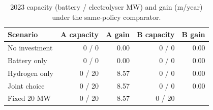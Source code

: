 \begin{table}[H]
\centering\small
\caption{2023 capacity (battery / electrolyser MW) and gain (\gbp m/year) under the same-policy comparator.}
\label{tab:portfolios}
\begin{tabularx}{\linewidth}{@{}Y r r r r@{}}
\toprule
Scenario & A capacity & A gain & B capacity & B gain \\
\midrule
No investment & 0 / 0 & 0.00 & 0 / 0 & 0.00 \\
Battery only & 0 / 0 & 0.00 & 0 / 0 & 0.00 \\
Hydrogen only & 0 / 20 & 8.57 & 0 / 0 & 0.00 \\
Joint choice & 0 / 20 & 8.57 & 0 / 0 & 0.00 \\
Fixed 20 MW & 0 / 20 & 8.57 & 0 / 20 &  \\
\bottomrule
\end{tabularx}
\end{table}

